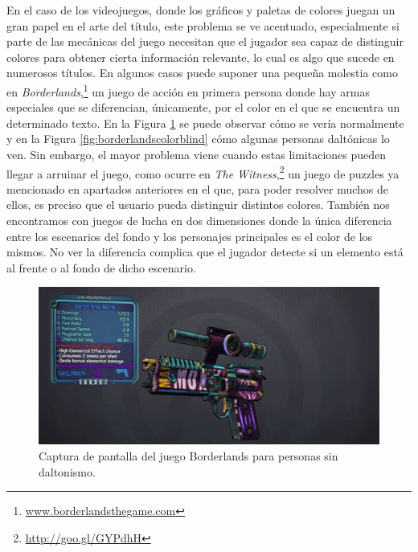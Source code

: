 En el caso de los videojuegos, donde los gráficos y paletas de colores juegan un gran papel en el arte del título, este problema se ve acentuado, especialmente si parte de las mecánicas del juego necesitan que el jugador sea capaz de distinguir colores para obtener cierta información relevante, lo cual es algo que sucede en numerosos títulos. En algunos casos puede suponer una pequeña molestia como en \textit{Borderlands},\footnote{\url{www.borderlandsthegame.com}} un juego de acción en primera persona donde hay armas especiales que se diferencian, únicamente, por el color en el que se encuentra un determinado texto. En la Figura \ref{fig:borderlandsnormal} se puede observar cómo se vería normalmente y en la Figura \ref{fig:borderlandscolorblind} cómo algunas personas daltónicas lo ven. 
Sin embargo, el mayor problema viene cuando estas limitaciones pueden llegar a arruinar el juego, como ocurre en \textit{The Witness},\footnote{\url{http://goo.gl/GYPdhH}} un juego de puzzles ya mencionado en apartados anteriores en el que, para poder resolver muchos de ellos, es preciso que el usuario pueda distinguir distintos colores. 
También nos encontramos con juegos de lucha en dos dimensiones donde la única diferencia entre los escenarios del fondo y los personajes principales es el color de los mismos. No ver la diferencia complica que el jugador detecte si un elemento está al frente o al fondo de dicho escenario.

\begin{figure}[H]
		\includegraphics[width=\textwidth,height=\textheight,keepaspectratio]{./img/borderlandsnormal.png}
	\caption{Captura de pantalla del juego Borderlands para personas sin daltonismo.}
	\label{fig:borderlandsnormal}
\end{figure}

